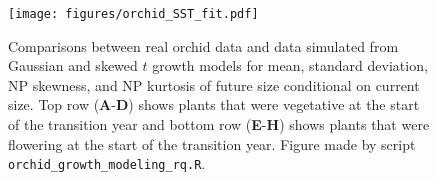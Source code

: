 \documentclass[12pt]{article}
\begin{document}
\begin{figure}[tbp]
	\centering
	\texttt{[image: figures/orchid\_SST\_fit.pdf]}
	\caption{Comparisons between real orchid data and data simulated from Gaussian and skewed $t$ growth models for mean, standard deviation, NP skewness, and NP kurtosis of future size conditional on current size. Top row (\textbf{A}-\textbf{D}) shows plants that were vegetative at the start of the transition year and bottom row (\textbf{E}-\textbf{H}) shows plants that were flowering at the start of the transition year. Figure made by script \texttt{orchid\_growth\_modeling\_rq.R}.}
	\label{fig:orchid_SST_fit}
\end{figure} 
\end{document}
